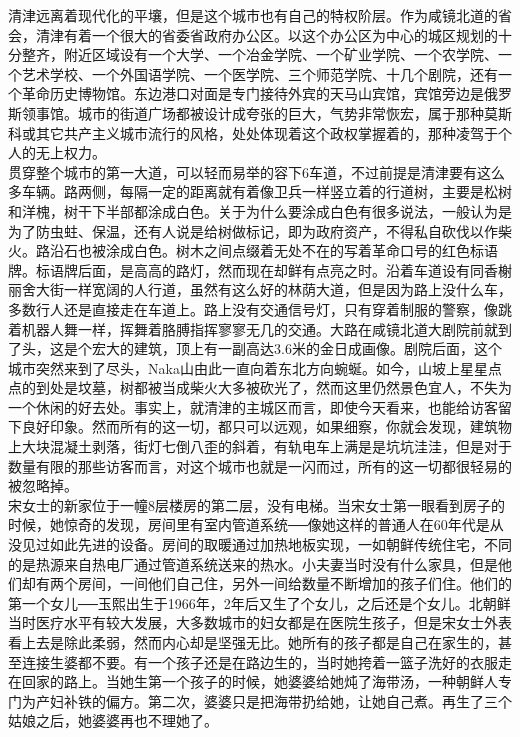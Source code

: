 清津远离着现代化的平壤，但是这个城市也有自己的特权阶层。作为咸镜北道的省会，清津有着一个很大的省委省政府办公区。以这个办公区为中心的城区规划的十分整齐，附近区域设有一个大学、一个冶金学院、一个矿业学院、一个农学院、一个艺术学校、一个外国语学院、一个医学院、三个师范学院、十几个剧院，还有一个革命历史博物馆。东边港口对面是专门接待外宾的天马山宾馆，宾馆旁边是俄罗斯领事馆。城市的街道广场都被设计成夸张的巨大，气势非常恢宏，属于那种莫斯科或其它共产主义城市流行的风格，处处体现着这个政权掌握着的，那种凌驾于个人的无上权力。\\

贯穿整个城市的第一大道，可以轻而易举的容下6车道，不过前提是清津要有这么多车辆。路两侧，每隔一定的距离就有着像卫兵一样竖立着的行道树，主要是松树和洋槐，树干下半部都涂成白色。关于为什么要涂成白色有很多说法，一般认为是为了防虫蛀、保温，还有人说是给树做标记，即为政府资产，不得私自砍伐以作柴火。路沿石也被涂成白色。树木之间点缀着无处不在的写着革命口号的红色标语牌。标语牌后面，是高高的路灯，然而现在却鲜有点亮之时。沿着车道设有同香榭丽舍大街一样宽阔的人行道，虽然有这么好的林荫大道，但是因为路上没什么车，多数行人还是直接走在车道上。路上没有交通信号灯，只有穿着制服的警察，像跳着机器人舞一样，挥舞着胳膊指挥寥寥无几的交通。大路在咸镜北道大剧院前就到了头，这是个宏大的建筑，顶上有一副高达3.6米的金日成画像。剧院后面，这个城市突然来到了尽头，Naka山由此一直向着东北方向蜿蜒。如今，山坡上星星点点的到处是坟墓，树都被当成柴火大多被砍光了，然而这里仍然景色宜人，不失为一个休闲的好去处。事实上，就清津的主城区而言，即使今天看来，也能给访客留下良好印象。然而所有的这一切，都只可以远观，如果细察，你就会发现，建筑物上大块混凝土剥落，街灯七倒八歪的斜着，有轨电车上满是是坑坑洼洼，但是对于数量有限的那些访客而言，对这个城市也就是一闪而过，所有的这一切都很轻易的被忽略掉。\\

宋女士的新家位于一幢8层楼房的第二层，没有电梯。当宋女士第一眼看到房子的时候，她惊奇的发现，房间里有室内管道系统──像她这样的普通人在60年代是从没见过如此先进的设备。房间的取暖通过加热地板实现，一如朝鲜传统住宅，不同的是热源来自热电厂通过管道系统送来的热水。小夫妻当时没有什么家具，但是他们却有两个房间，一间他们自己住，另外一间给数量不断增加的孩子们住。他们的第一个女儿──玉熙出生于1966年，2年后又生了个女儿，之后还是个女儿。北朝鲜当时医疗水平有较大发展，大多数城市的妇女都是在医院生孩子，但是宋女士外表看上去是除此柔弱，然而内心却是坚强无比。她所有的孩子都是自己在家生的，甚至连接生婆都不要。有一个孩子还是在路边生的，当时她挎着一篮子洗好的衣服走在回家的路上。当她生第一个孩子的时候，她婆婆给她炖了海带汤，一种朝鲜人专门为产妇补铁的偏方。第二次，婆婆只是把海带扔给她，让她自己煮。再生了三个姑娘之后，她婆婆再也不理她了。\\

